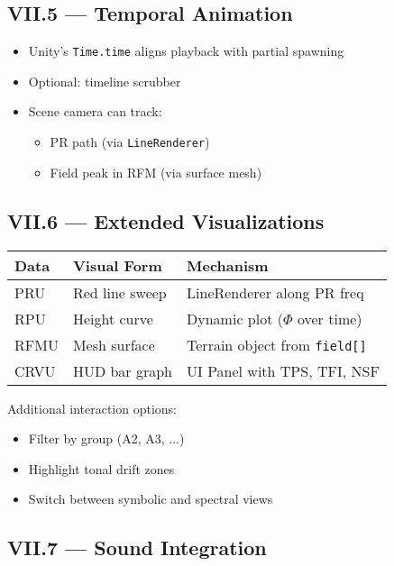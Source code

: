 \subsection*{VII.5 — Temporal Animation}

\begin{itemize}
    \item Unity’s \texttt{Time.time} aligns playback with partial spawning
    \item Optional: timeline scrubber
    \item Scene camera can track:
    \begin{itemize}
        \item PR path (via \texttt{LineRenderer})
        \item Field peak in RFM (via surface mesh)
    \end{itemize}
\end{itemize}

\subsection*{VII.6 — Extended Visualizations}

\begin{center}
\begin{tabular}{|l|l|l|}
\hline
\textbf{Data} & \textbf{Visual Form} & \textbf{Mechanism} \\
\hline
PRU & Red line sweep & LineRenderer along PR freq \\
RPU & Height curve & Dynamic plot ($\Phi$ over time) \\
RFMU & Mesh surface & Terrain object from \texttt{field[]} \\
CRVU & HUD bar graph & UI Panel with TPS, TFI, NSF \\
\hline
\end{tabular}
\end{center}

Additional interaction options:

\begin{itemize}
    \item Filter by group (A2, A3, ...)
    \item Highlight tonal drift zones
    \item Switch between symbolic and spectral views
\end{itemize}

\subsection*{VII.7 — Sound Integration}

